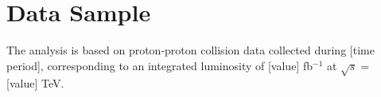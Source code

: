 \section{Data Sample}
\label{sec:RESULTS_DATA_SAMPLE}

The analysis is based on proton-proton collision data collected during [time period], corresponding to an integrated luminosity of [value] fb$^{-1}$ at $\sqrt{s} = $ [value] TeV.

